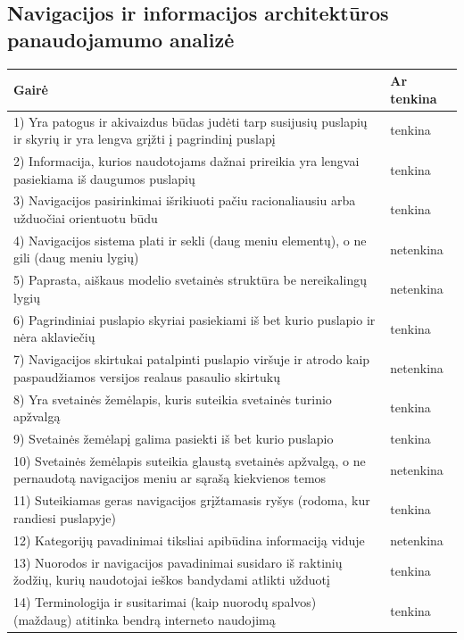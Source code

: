 \documentclass{VUMIFPSkursinis}
\begin{document}
\subsection{Navigacijos ir informacijos architektūros panaudojamumo analizė}
\begin{center}
\begin{longtable}{ |p{}|p{2cm}| } 
 \hline
	Gairė & Ar tenkina \\ \hline
	1) Yra patogus ir akivaizdus būdas judėti tarp susijusių puslapių ir skyrių ir yra lengva grįžti į pagrindinį puslapį & tenkina \\ \hline
	2) Informacija, kurios naudotojams dažnai prireikia yra lengvai pasiekiama iš daugumos puslapių & tenkina \\ \hline
	3) Navigacijos pasirinkimai išrikiuoti pačiu racionaliausiu arba užduočiai orientuotu būdu & tenkina \\ \hline
	4) Navigacijos sistema plati ir sekli (daug meniu elementų), o ne gili (daug meniu lygių)  & netenkina \\ \hline
	5) Paprasta, aiškaus modelio svetainės struktūra be nereikalingų lygių & netenkina \\ \hline
	6) Pagrindiniai puslapio skyriai pasiekiami iš bet kurio puslapio ir nėra aklaviečių & tenkina \\ \hline
	7) Navigacijos skirtukai patalpinti puslapio viršuje ir atrodo kaip paspaudžiamos versijos realaus pasaulio skirtukų & netenkina \\ \hline
	8) Yra svetainės žemėlapis, kuris suteikia svetainės turinio apžvalgą & tenkina \\ \hline
	9) Svetainės žemėlapį galima pasiekti iš bet kurio puslapio & tenkina \\ \hline
	10) Svetainės žemėlapis suteikia glaustą svetainės apžvalgą, o ne pernaudotą navigacijos meniu ar sąrašą kiekvienos temos & netenkina \\ \hline
	11) Suteikiamas geras navigacijos grįžtamasis ryšys (rodoma, kur randiesi puslapyje) & tenkina \\ \hline
	12) Kategorijų pavadinimai tiksliai apibūdina informaciją viduje & netenkina \\ \hline
	13) Nuorodos ir navigacijos pavadinimai susidaro iš raktinių žodžių, kurių naudotojai ieškos bandydami atlikti užduotį & tenkina \\ \hline
	14) Terminologija ir susitarimai (kaip nuorodų spalvos) (maždaug) atitinka bendrą interneto naudojimą & tenkina \\ \hline

\end{longtable}
\end{center}
\end{document}
